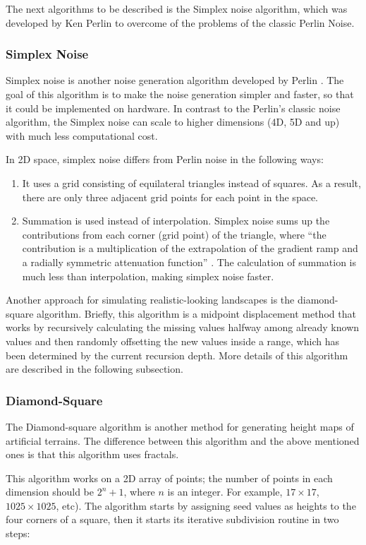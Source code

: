 The next algorithms to be described is the Simplex noise algorithm, which was developed by Ken Perlin \cite{perlin:2001} to overcome of the problems of the classic Perlin Noise.

\subsubsection{Simplex Noise}
Simplex noise is another noise generation algorithm developed by Perlin \cite{perlin:2001}. The goal of this algorithm is to make the noise generation simpler and faster, so that it could be implemented on hardware. In contrast to the Perlin's classic noise algorithm, the Simplex noise can scale to higher dimensions (4D, 5D and up) with much less computational cost. 

In 2D space, simplex noise differs from Perlin noise in the following ways:
\begin{enumerate}
	\item It uses a grid consisting of equilateral triangles instead of squares. As a result, there are only three adjacent grid points for each point in the space.
	\item Summation is used instead of interpolation. Simplex noise sums up the contributions from each corner (grid point) of the triangle, where ``the contribution is a multiplication of the extrapolation of the gradient ramp and a radially symmetric attenuation function'' \cite{Gustavson2005}. The calculation of summation is much less than interpolation, making simplex noise faster.
\end{enumerate}

Another approach for simulating realistic-looking landscapes is the diamond-square algorithm. Briefly, this algorithm is a midpoint displacement method that works by recursively calculating the missing values halfway among already known values and then randomly offsetting the new values inside a range, which has been determined by the current recursion depth. More details of this algorithm are described in the following subsection.

\subsubsection{Diamond-Square}
The Diamond-square algorithm is another method for generating height maps of artificial terrains. The difference between this algorithm and the above mentioned ones is that this algorithm uses fractals. 

This algorithm works on a 2D array of points; the number of points in each dimension should be $2^{n} + 1$, where $n$ is an integer. For example, $17 \times 17$, $1025 \times 1025$, etc). The algorithm starts by assigning seed values as heights to the four corners of a square, then it starts its iterative subdivision routine in two steps:

